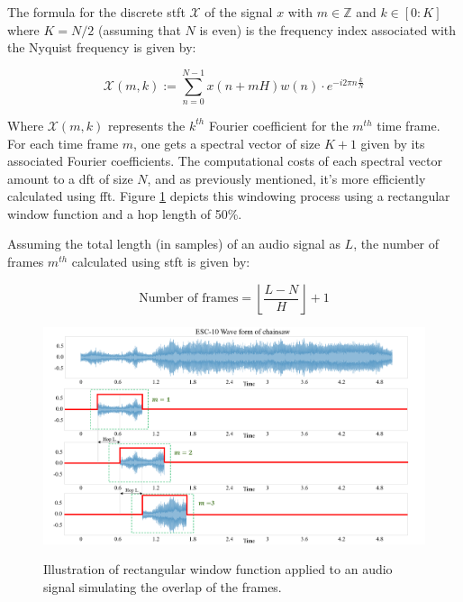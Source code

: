 The formula for the discrete \gls{stft} $\mathcal{X}$ of the signal $x$ with $m \in \mathbb{Z}$ and $k \in [0:K]$ where $K = N/2$ (assuming that $N$ is even) is the frequency index associated with the Nyquist frequency is given by:

\begin{equation}
    \label{eq:frmwk_stft_discrete_stft}
    \mathcal{X}(m, k):=\sum_{n=0}^{N-1} x(n+m H) w(n) \cdot e^{-i 2 \pi n \frac{k}{N}}
\end{equation}

Where $\mathcal{X}(m, k)$ represents the $k^{th}$ Fourier coefficient for the $m^{th}$ time frame. For each time frame $m$, one gets a spectral vector of size $K+1$ given by its associated Fourier coefficients. The computational costs of each spectral vector amount to a \gls{dft} of size $N$, and as previously mentioned, it's more efficiently calculated using \gls{fft}. Figure \ref{fig:frmwk_stft_windowing} depicts this windowing process using a rectangular window function and a hop length of 50\%.

Assuming the total length (in samples) of an audio signal as $L$, the number of frames $m^{th}$ calculated using \gls{stft} is given by:

\begin{equation}
    \label{eq:frmwk_stft_frames}
    \text{Number of frames} = \left\lfloor \frac{L-N}{H} \right\rfloor + 1
\end{equation}

\begin{figure}[htbp]
    \raggedright
        \caption{Illustration of rectangular window function applied to an audio signal simulating the overlap of the frames.}
        \includegraphics[width=1.0\textwidth]{resources/images/030-theoretical_framework/Framework_stft_windowing.png}
        \label{fig:frmwk_stft_windowing}
\end{figure}


